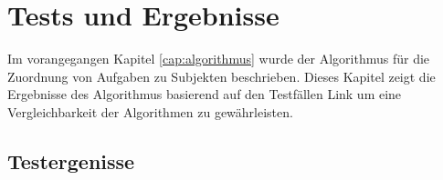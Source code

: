 %
%
% 
% 
% 


\chapter{Tests und Ergebnisse}
\label{chap:Ergebnisse}
Im vorangegangen Kapitel \ref{cap:algorithmus} wurde der Algorithmus für die Zuordnung von Aufgaben zu Subjekten beschrieben. Dieses Kapitel zeigt die Ergebnisse des Algorithmus basierend auf den Testfällen  Link um eine Vergleichbarkeit der Algorithmen zu gewährleisten. 

\section{Testergenisse} %
\label{sec:testergenisse}

